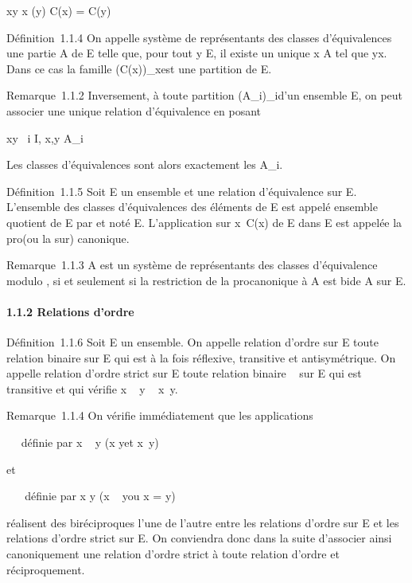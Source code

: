 xy \Leftrightarrow x \inC(y) \mathrel\Leftrightarrow
C(x) = C(y)

Définition~1.1.4 On appelle système de représentants des classes
d'équivalences une partie A de E telle que, pour tout y \in E, il existe
un unique x \in A tel que yx. Dans ce cas la famille
\left (C(x)\right )\_x\inA est une
partition de E.

Remarque~1.1.2 Inversement, à toute partition
(A\_i)\_i\inI d'un ensemble E, on peut associer une unique
relation d'équivalence en posant

xy \Leftrightarrow \exists~i \in I, x,y \in
A\_i

Les classes d'équivalences sont alors exactement les A\_i.

Définition~1.1.5 Soit E un ensemble et  une relation d'équivalence sur
E. L'ensemble des classes d'équivalences des éléments de E est appelé
ensemble quotient de E par  et noté E\diagup{}. L'application sur\jmathective
x\mapsto~C(x) de E dans E\diagup{} est appelée la
pro\jmathection (ou la sur\jmathection) canonique.

Remarque~1.1.3 A est un système de représentants des classes
d'équivalence modulo , si et seulement si la restriction de la
pro\jmathection canonique à A est bi\jmathective de A sur E\diagup{}.

\paragraph{1.1.2 Relations d'ordre}

Définition~1.1.6 Soit E un ensemble. On appelle relation d'ordre sur E
toute relation binaire \leqslant sur E qui est à la fois réflexive, transitive
et antisymétrique. On appelle relation d'ordre strict sur E toute
relation binaire \prec~ sur E qui est transitive et qui vérifie x \prec~ y \rigtharrow~
x\neq~y.

Remarque~1.1.4 On vérifie immédiatement que les applications

\leqslant \mapsto~ \prec~\text définie par x \prec~
y \Leftrightarrow (x \leqslant y\text et
x\neq~y)

et

\prec~ \mapsto~ \leqslant\text définie par x \leqslant
y \Leftrightarrow (x \prec~ y\text ou x = y)

réalisent des bi\jmathections réciproques l'une de l'autre entre les
relations d'ordre sur E et les relations d'ordre strict sur E. On
conviendra donc dans la suite d'associer ainsi canoniquement une
relation d'ordre strict à toute relation d'ordre et réciproquement.

